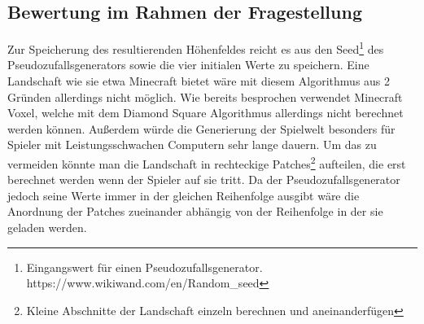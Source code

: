 \subsection{Bewertung im Rahmen der Fragestellung}
Zur Speicherung des resultierenden Höhenfeldes reicht es aus den Seed\footnote{Eingangswert für einen Pseudozufallsgenerator. https://www.wikiwand.com/en/Random\_seed} des Pseudozufallsgenerators sowie die vier initialen Werte zu speichern. Eine Landschaft wie sie etwa Minecraft bietet wäre mit diesem Algorithmus aus 2 Gründen allerdings nicht möglich. Wie bereits besprochen verwendet Minecraft Voxel, welche mit dem Diamond Square Algorithmus allerdings nicht berechnet werden können. Außerdem würde die Generierung der Spielwelt besonders für Spieler mit Leistungsschwachen Computern sehr lange dauern. Um das zu vermeiden könnte man die Landschaft in rechteckige Patches\footnote{Kleine Abschnitte der Landschaft einzeln berechnen und aneinanderfügen} aufteilen, die erst berechnet werden wenn der Spieler auf sie tritt. Da der Pseudozufallsgenerator jedoch seine Werte immer in der gleichen Reihenfolge ausgibt wäre die Anordnung der Patches zueinander abhängig von der Reihenfolge in der sie geladen werden\label{Patches}.

